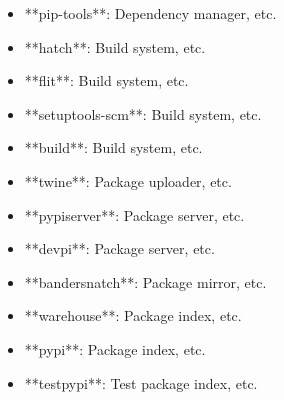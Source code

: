 \documentclass[11pt,a4paper]{article}
\begin{document}
\begin{itemize}
\item **pip-tools**: Dependency manager, etc.
\end{itemize}

\begin{itemize}
\item **hatch**: Build system, etc.
\end{itemize}

\begin{itemize}
\item **flit**: Build system, etc.
\end{itemize}

\begin{itemize}
\item **setuptools-scm**: Build system, etc.
\end{itemize}

\begin{itemize}
\item **build**: Build system, etc.
\end{itemize}

\begin{itemize}
\item **twine**: Package uploader, etc.
\end{itemize}

\begin{itemize}
\item **pypiserver**: Package server, etc.
\end{itemize}

\begin{itemize}
\item **devpi**: Package server, etc.
\end{itemize}

\begin{itemize}
\item **bandersnatch**: Package mirror, etc.
\end{itemize}

\begin{itemize}
\item **warehouse**: Package index, etc.
\end{itemize}

\begin{itemize}
\item **pypi**: Package index, etc.
\end{itemize}

\begin{itemize}
\item **testpypi**: Test package index, etc.
\end{itemize}
\end{document}
